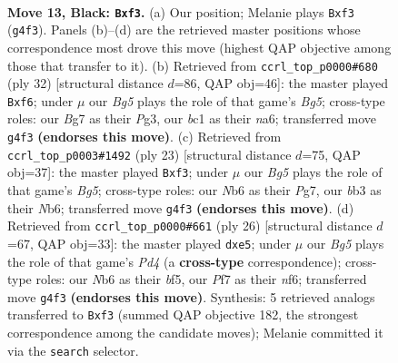 \documentclass[11pt]{article}
\begin{document}
\clearpage

\begin{figure}[p]\centering
\begin{subfigure}{0.46\textwidth}\centering
\resizebox{\linewidth}{!}{%
\newchessgame
\chessboard[
  setfen={2kr2r1/ppp1ppbp/1nn3p1/4P3/6bP/NB3N2/PPP2PP1/R1B1K1R1 b - - 2 13},
  showmover=false,
  pgfstyle=straightmove, color=movearrow, markmove={g4-f3}
]}
\caption{}
\end{subfigure}\hfill
\begin{subfigure}{0.46\textwidth}\centering
\resizebox{\linewidth}{!}{%
\newchessgame
\chessboard[
  setfen={r3r1k1/pb4bp/np3np1/2p1p1B1/1PP1p3/P1N3PN/5PBP/2RR2K1 w - - 0 17},
  showmover=false,
  pgfstyle=straightmove, color=movearrow, markmove={g5-f6}
]}
\caption{}
\end{subfigure}
\\[4pt]
\begin{subfigure}{0.46\textwidth}\centering
\resizebox{\linewidth}{!}{%
\newchessgame
\chessboard[
  setfen={r4rk1/ppp1bpp1/1nn4p/1N2P3/4P1bP/P3BN2/1P3PP1/R3KB1R b KQ - 6 12},
  showmover=false,
  pgfstyle=straightmove, color=movearrow, markmove={g4-f3}
]}
\caption{}
\end{subfigure}\hfill
\begin{subfigure}{0.46\textwidth}\centering
\resizebox{\linewidth}{!}{%
\newchessgame
\chessboard[
  setfen={r2bk2r/1p3ppp/2p1pn2/p3nb2/3P4/1N4P1/PP1BPPBP/R4RK1 w kq - 0 14},
  showmover=false,
  pgfstyle=straightmove, color=movearrow, markmove={d4-e5}
]}
\caption{}
\end{subfigure}
\caption{\textbf{Move 13, Black: \texttt{Bxf3}.} (a) Our position; Melanie plays \texttt{Bxf3} (\texttt{g4f3}). Panels (b)--(d) are the retrieved master positions whose correspondence most drove this move (highest QAP objective among those that transfer to it). (b) Retrieved from \texttt{ccrl\_top\_p0000\#680} (ply 32) [structural distance $d$=86, QAP obj=46]: the master played \texttt{Bxf6}; under $\mu$ our \emph{Bg5} plays the role of that game's \emph{Bg5}; cross-type roles: our \emph{B}g7 as their \emph{P}g3, our \emph{b}c1 as their \emph{n}a6; transferred move \texttt{g4f3} \textbf{(endorses this move)}. (c) Retrieved from \texttt{ccrl\_top\_p0003\#1492} (ply 23) [structural distance $d$=75, QAP obj=37]: the master played \texttt{Bxf3}; under $\mu$ our \emph{Bg5} plays the role of that game's \emph{Bg5}; cross-type roles: our \emph{N}b6 as their \emph{P}g7, our \emph{b}b3 as their \emph{N}b6; transferred move \texttt{g4f3} \textbf{(endorses this move)}. (d) Retrieved from \texttt{ccrl\_top\_p0000\#661} (ply 26) [structural distance $d$=67, QAP obj=33]: the master played \texttt{dxe5}; under $\mu$ our \emph{Bg5} plays the role of that game's \emph{Pd4} (a \textbf{cross-type} correspondence); cross-type roles: our \emph{N}b6 as their \emph{b}f5, our \emph{P}f7 as their \emph{n}f6; transferred move \texttt{g4f3} \textbf{(endorses this move)}. Synthesis: 5 retrieved analogs transferred to \texttt{Bxf3} (summed QAP objective 182, the strongest correspondence among the candidate moves); Melanie committed it via the \texttt{search} selector.}
\label{fig:thought-m25}
\end{figure}
\end{document}

